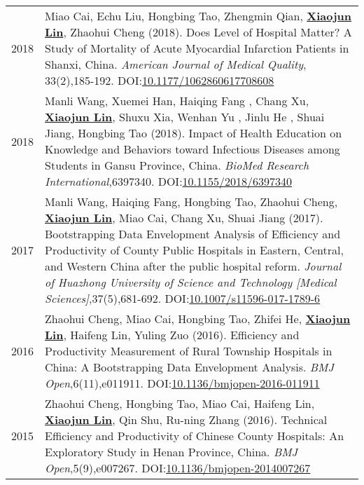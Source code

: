 \documentclass[a4paper,10pt]{article}
\begin{document}
\begin{longtable}{r p{13cm}}
2018 & Miao Cai, Echu Liu, Hongbing Tao, Zhengmin Qian, \underline{\textbf{Xiaojun Lin}}, Zhaohui Cheng (2018). Does Level of Hospital Matter? A Study of Mortality of Acute Myocardial Infarction Patients in Shanxi, China. \emph{American Journal of Medical Quality}, 33(2),185-192. DOI:\href{https://doi.org/10.1177/1062860617708608}{10.1177/1062860617708608}\\[5pt] 

2018 & Manli Wang, Xuemei Han, Haiqing Fang , Chang Xu, \underline{\textbf{Xiaojun Lin}}, Shuxu Xia, Wenhan Yu , Jinlu He , Shuai Jiang, Hongbing Tao (2018). Impact of Health Education on Knowledge and Behaviors toward Infectious Diseases among Students in Gansu Province, China. \emph{BioMed Research International},6397340. DOI:\href{https://doi.org/10.1155/2018/6397340}{10.1155/2018/6397340}\\[5pt]

2017 & Manli Wang, Haiqing Fang, Hongbing Tao, Zhaohui Cheng, \underline{\textbf{Xiaojun Lin}}, Miao Cai, Chang Xu, Shuai Jiang (2017). Bootstrapping Data Envelopment Analysis of Efficiency and Productivity of County Public Hospitals in Eastern, Central, and Western China after the public hospital reform. \emph{Journal of Huazhong University of Science and Technology [Medical Sciences]},37(5),681-692. DOI:\href{https://doi.org/10.1007/s11596-017-1789-6}{10.1007/s11596-017-1789-6}\\[5pt]

2016 &  Zhaohui Cheng, Miao Cai, Hongbing Tao, Zhifei He, \underline{\textbf{Xiaojun Lin}}, Haifeng Lin, Yuling Zuo (2016). Efficiency and Productivity Measurement of Rural Township Hospitals in China: A Bootstrapping Data Envelopment Analysis. \emph{BMJ Open},6(11),e011911. DOI:\href{https://doi.org/10.1136/bmjopen-2016-011911}{10.1136/bmjopen-2016-011911}\\[5pt]

2015 & Zhaohui Cheng, Hongbing Tao, Miao Cai, Haifeng Lin, \underline{\textbf{Xiaojun Lin}}, Qin Shu, Ru-ning Zhang (2016). Technical Efficiency and Productivity of Chinese County Hospitals: An Exploratory Study in Henan Province, China. \emph{BMJ Open},5(9),e007267. DOI:\href{https://doi.org/10.1136/bmjopen-2014007267}{10.1136/bmjopen-2014007267}\\[5pt] 

\end{longtable}
\end{document}
